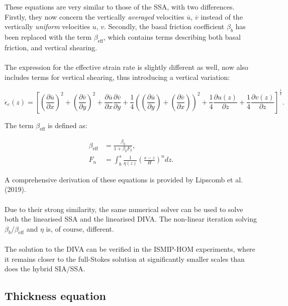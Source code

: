 \documentclass{article}
\begin{document}
These equations are very similar to those of the SSA, with two differences. Firstly, they now concern the vertically \emph{ averaged} velocities $\overline{u}$, $\overline{v}$ instead of the vertically \emph{uniform} velocities $u$, $v$. Secondly, the basal friction coefficient $\beta_b$ has been replaced with the term $\beta_{\textrm{eff}}$, which contains terms describing both basal friction, and vertical shearing.\\
\\
The expression for the effective strain rate is slightly different as well, now also includes terms for vertical shearing, thus introducing a vertical variation:

\begin{equation} \label{eq:DIVA_02}
{\dot{\epsilon}}_e \left( z \right) = { \left[ {\left( \frac{\partial \overline{u}}{\partial x} \right) }^2 + {\left( \frac{\partial \overline{v}}{\partial y} \right) }^2 + \frac{\partial \overline{u}}{\partial x} \frac{\partial \overline{v}}{\partial y} + \frac14 {\left( {\left( \frac{\partial \overline{u}}{\partial y} \right) } + {\left( \frac{\partial \overline{v}}{\partial x} \right) } \right)}^2 + \frac14 \frac{\partial u \left( z \right)}{\partial z} + \frac14 \frac{\partial v \left( z \right)}{\partial z} \right] }^{\frac12}.
\end{equation}

The term $\beta_{\textrm{eff}}$ is defined as:

\begin{align} \label{DIVA_03}
\beta_{\textrm{eff}} &= \frac{\beta_b}{1 + \beta_b F_2}, \\
F_n &= \int_b^s \frac{1}{\eta \left( z \right)} {\left( \frac{s - z}{H} \right)}^n dz.
\end{align}

A comprehensive derivation of these equations is provided by Lipscomb et al. (2019).\\
\\
Due to their strong similarity, the same numerical solver can be used to solve both the linearised SSA and the linearised DIVA. The non-linear iteration solving $\beta_b$/$\beta_{\textrm{eff}}$ and $\eta$ is, of course, different.\\
\\
The solution to the DIVA can be verified in the ISMIP-HOM experiments, where it remains closer to the full-Stokes solution at significantly smaller scales than does the hybrid SIA/SSA.

\newpage
\subsection{Thickness equation}
\end{document}
